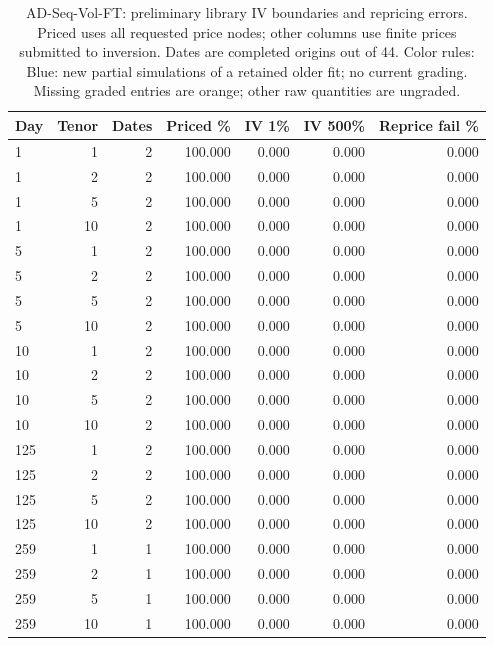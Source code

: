 \documentclass[11pt]{article}
\begin{document}
\begin{table}[H]\centering\small\setlength{\tabcolsep}{4pt}
\caption{AD-Seq-Vol-FT: preliminary library IV boundaries and repricing errors. Priced uses all requested price nodes; other columns use finite prices submitted to inversion. Dates are completed origins out of 44. Color rules: Blue: new partial simulations of a retained older fit; no current grading. Missing graded entries are orange; other raw quantities are ungraded.}\label{tab:diffusion-boundary-ft}
\begin{tabular}{@{}lrrrrrr@{}}
\toprule
Day & Tenor & Dates & Priced \% & IV 1\% & IV 500\% & Reprice fail \% \\
\midrule
1 & 1 & 2 & 100.000 & 0.000 & 0.000 & 0.000 \\
1 & 2 & 2 & 100.000 & 0.000 & 0.000 & 0.000 \\
1 & 5 & 2 & 100.000 & 0.000 & 0.000 & 0.000 \\
1 & 10 & 2 & 100.000 & 0.000 & 0.000 & 0.000 \\
5 & 1 & 2 & 100.000 & 0.000 & 0.000 & 0.000 \\
5 & 2 & 2 & 100.000 & 0.000 & 0.000 & 0.000 \\
5 & 5 & 2 & 100.000 & 0.000 & 0.000 & 0.000 \\
5 & 10 & 2 & 100.000 & 0.000 & 0.000 & 0.000 \\
10 & 1 & 2 & 100.000 & 0.000 & 0.000 & 0.000 \\
10 & 2 & 2 & 100.000 & 0.000 & 0.000 & 0.000 \\
10 & 5 & 2 & 100.000 & 0.000 & 0.000 & 0.000 \\
10 & 10 & 2 & 100.000 & 0.000 & 0.000 & 0.000 \\
125 & 1 & 2 & 100.000 & 0.000 & 0.000 & 0.000 \\
125 & 2 & 2 & 100.000 & 0.000 & 0.000 & 0.000 \\
125 & 5 & 2 & 100.000 & 0.000 & 0.000 & 0.000 \\
125 & 10 & 2 & 100.000 & 0.000 & 0.000 & 0.000 \\
259 & 1 & 1 & 100.000 & 0.000 & 0.000 & 0.000 \\
259 & 2 & 1 & 100.000 & 0.000 & 0.000 & 0.000 \\
259 & 5 & 1 & 100.000 & 0.000 & 0.000 & 0.000 \\
259 & 10 & 1 & 100.000 & 0.000 & 0.000 & 0.000 \\
\bottomrule\end{tabular}\end{table}
\end{document}
